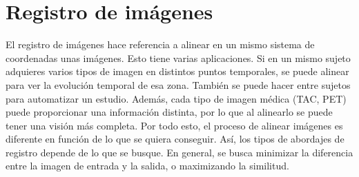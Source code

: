 \chapter{Registro de imágenes}
El registro de imágenes hace referencia a alinear en un mismo sistema de coordenadas unas imágenes. Esto tiene varias aplicaciones. Si en un mismo sujeto adquieres varios tipos de imagen en distintos puntos temporales, se puede alinear para ver la evolución temporal de esa zona. También se puede hacer entre sujetos para automatizar un estudio. Además, cada tipo de imagen médica (TAC, PET) puede proporcionar una información distinta, por lo que al alinearlo se puede tener una visión más completa. Por todo esto, el proceso de alinear imágenes es diferente en función de lo que se quiera conseguir. Así, los tipos de abordajes de registro depende de lo que se busque. En general, se busca minimizar la diferencia entre la imagen de entrada y la salida, o maximizando la similitud. 

